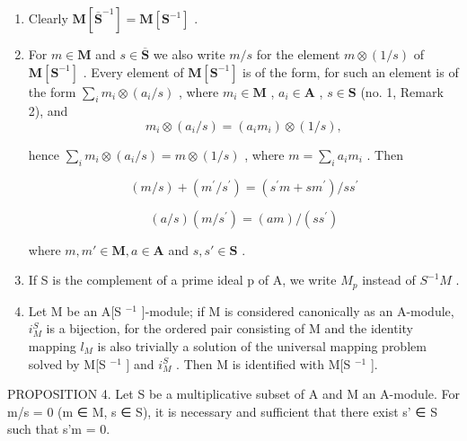 \begin{enumerate}
\def\labelenumi{(\arabic{enumi})}
\item
  Clearly \(\mathbf{M}[\overline{\mathbf{S}}^{-1}] = \mathbf{M}[\mathbf{S}^{-1}]\) .
\item
  For \(m \in \mathbf{M}\) and \(s \in \overline{\mathbf{S}}\) we also write \(m / s\) for the element \(m \otimes (1 / s)\) of \(\mathbf{M}[\mathbf{S}^{-1}]\) . Every element of \(\mathbf{M}[\mathbf{S}^{-1}]\) is of the form, for such an element is of the form \(\sum_{i} m_i \otimes (a_i / s)\) , where \(m_i \in \mathbf{M}\) , \(a_i \in \mathbf{A}\) , \(s \in \mathbf{S}\) (no. 1, Remark 2), and
\[
m _ {i} \otimes (a _ {i} / s) = (a _ {i} m _ {i}) \otimes (1 / s),
\]

hence \(\sum_{i} m_{i} \otimes (a_{i}/s) = m \otimes (1/s)\) , where \(m = \sum_{i} a_{i} m_{i}\) . Then


\[
(m / s) + (m ^ {\prime} / s ^ {\prime}) = (s ^ {\prime} m + s m ^ {\prime}) / s s ^ {\prime}\tag{4}
\]

\[
(a / s) (m / s ^ {\prime}) = (a m) / (s s ^ {\prime})\tag{5}
\]

where \(m, m' \in \mathbf{M}, a \in \mathbf{A}\) and \(s, s' \in \mathbf{S}\) .

\item
  If S is the complement of a prime ideal p of A, we write \(M_{p}\) instead of \(S^{-1}M\) .
\item
  Let M be an A{[}S \(^{-1}\) {]}-module; if M is considered canonically as an A-module, \(i_{M}^{S}\) is a bijection, for the ordered pair consisting of M and the identity mapping \(l_{M}\) is also trivially a solution of the universal mapping problem solved by M{[}S \(^{-1}\) {]} and \(i_{M}^{S}\) . Then M is identified with M{[}S \(^{-1}\) {]}.
\end{enumerate}

PROPOSITION 4. Let S be a multiplicative subset of A and M an A-module. For m/s = 0 (m ∈ M, s ∈ S), it is necessary and sufficient that there exist s' ∈ S such that s'm = 0.

